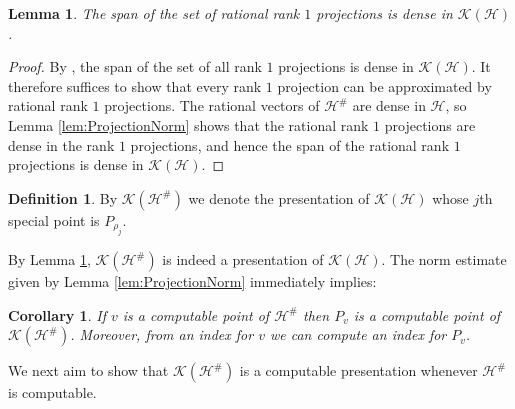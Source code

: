 \documentclass{amsart}
\theoremstyle{plain}
\newtheorem{lemma}[theorem]{Lemma}
\newtheorem{corollary}[theorem]{Corollary}
\theoremstyle{definition}
\newtheorem{definition}[theorem]{Definition}
\numberwithin{equation}{section}
\begin{document}
\begin{lemma}\label{lem:rationaldense}
The span of the set of rational rank $1$ projections is dense in $\mathcal{K}(\mathcal{H})$.    
\end{lemma}
\begin{proof}
By \cite[Theorems 2.4.5 and 2.4.6]{Murphy.1990}, the span of the set of all rank $1$ projections is dense in $\mathcal{K}(\mathcal{H})$.  It therefore suffices to show that every rank $1$ projection can be approximated by rational rank $1$ projections.  The rational vectors of $\mathcal{H}^{\#}$ are dense in $\mathcal{H}$, so Lemma \ref{lem:ProjectionNorm} shows that the rational rank $1$ projections are dense in the rank $1$ projections, and hence the span of the rational rank $1$ projections is dense in $\mathcal{K}(\mathcal{H})$.
\end{proof}

\begin{definition}
By $\mathcal{K}(\mathcal{H}^\#)$ we denote the presentation of $\mathcal{K}(\mathcal{H})$ whose $j$th special point is $P_{\rho_j}$.
\end{definition}

By Lemma \ref{lem:rationaldense}, $\mathcal{K}(\mathcal{H}^\#)$ is indeed a presentation of $\mathcal{K}(\mathcal{H})$.  The norm estimate given by Lemma \ref{lem:ProjectionNorm} immediately implies:

\begin{corollary}\label{cor:ComputePtProj}
If $v$ is a computable point of $\mathcal{H}^\#$ then $P_v$ is a computable point of $\mathcal{K}(\mathcal{H}^\#)$.  Moreover, from an index for $v$ we can compute an index for $P_v$.
\end{corollary}

We next aim to show that $\mathcal{K}(\mathcal{H}^\#)$ is a computable presentation whenever $\mathcal{H}^\#$ is computable.
\end{document}
